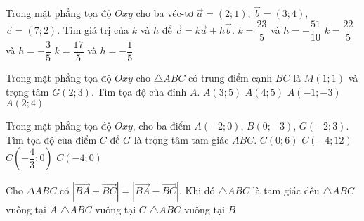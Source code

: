 \begin{ex}%
	Trong mặt phẳng tọa độ $Oxy$ cho ba véc-tơ $\vec{a}=(2;1)$, $\vec{b}=(3;4)$, $\vec{c}=(7;2)$. Tìm giá trị của $k$ và $h$ để $\vec{c}=k\vec{a}+h\vec{b}$.
	{$k=\dfrac{23}{5}$ và $h=-\dfrac{51}{10}$}
	{\True $k=\dfrac{22}{5}$ và $h=-\dfrac{3}{5}$}
	{$k=\dfrac{17}{5}$ và $h=-\dfrac{1}{5}$}
\end{ex}

\begin{ex}%
	Trong mặt phẳng tọa độ $Oxy$ cho $\triangle ABC$ có trung điểm cạnh $BC$ là $M(1;1)$ và trọng tâm $G(2;3)$. Tìm tọa độ của đỉnh $A$.
	\choice
	{$A(3;5)$}
	{$A(4;5)$}
	{\True $A(-1;-3)$}
	{$A(2;4)$}
\end{ex}

\begin{ex}%
	Trong mặt phẳng tọa độ $Oxy$, cho ba điểm $A(-2;0)$, $B(0;-3)$, $G(-2;3)$. Tìm tọa độ của điểm $C$ để $G$ là trọng tâm tam giác $ABC$.
	\choice
	{$C(0;6)$}
	{\True $C(-4;12)$}
	{$C\left(-\dfrac{4}{3};0\right)$}
	{$C(-4; 0)$}
\end{ex}


\begin{ex}%
	Cho $\Delta ABC$ có $\left|\vec{BA} + \vec{BC}\right| =\left |\vec{BA} - \vec{BC}\right|$. Khi đó
	\choice
	{$\triangle ABC$ là tam giác đều}
	{$\triangle ABC$ vuông tại $A$}
	{$\triangle ABC$ vuông tại $C$}
	{\True $\triangle ABC$ vuông tại $B$}
\end{ex}


